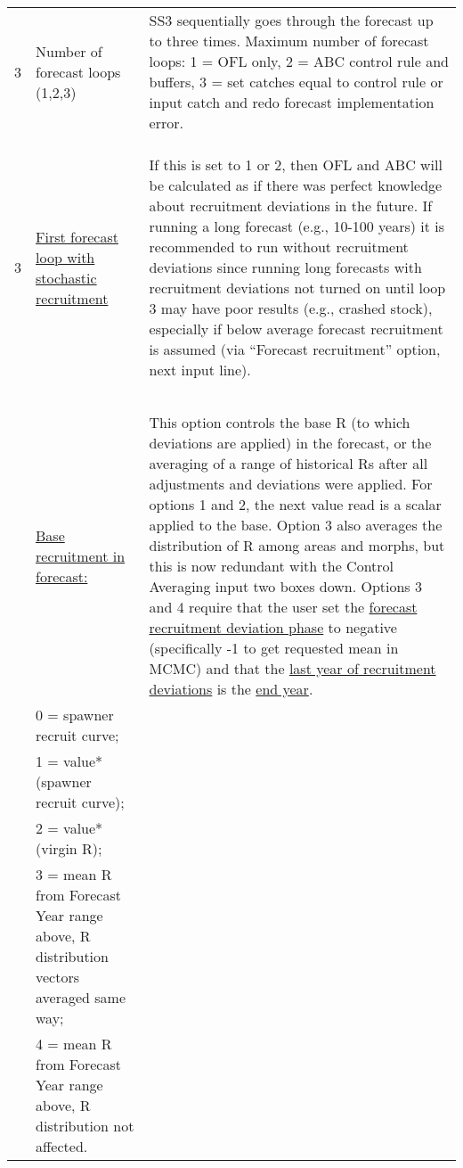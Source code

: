 \begin{landscape}
{\begin{longtable}{p{3.2cm} p{7cm} p{10.8cm}}
  \hline
  3 \Tstrut & Number of forecast loops (1,2,3) & \multirow{1}{1cm}[-0.25cm]{\parbox{11cm}{SS3 sequentially goes through the forecast up to three times. Maximum number of forecast loops: 1 = OFL only, 2 = ABC control rule and buffers, 3 = set catches equal to control rule or input catch and redo forecast implementation error.}} \\
    & & \\
    & & \\
    & & \Bstrut\Bstrut\\

  \hline
  3 \Tstrut & \hyperlink{appendB}{First forecast loop with stochastic recruitment} & \multirow{1}{1cm}[-0.25cm]{\parbox{11cm}{If this is set to 1 or 2, then OFL and ABC will be calculated as if there was perfect knowledge about recruitment deviations in the future. If running a long forecast (e.g., 10-100 years) it is recommended to run without recruitment deviations since running long forecasts with recruitment deviations not turned on until loop 3 may have poor results (e.g., crashed stock), especially if below average forecast recruitment is assumed (via ``Forecast recruitment'' option, next input line).}} \Bstrut\\
    & & \\
    & & \\
    & & \\
    & & \\
    & & \\

  \pagebreak
  1 \Tstrut & \hyperlink{ForeSpawn}{Base recruitment in forecast:} & \multirow{1}{1cm}[-0.25cm]{\parbox{11cm}{This option controls the base R (to which deviations are applied) in the forecast, or the averaging of a range of historical Rs after all adjustments and deviations were applied. For options 1 and 2, the next value read is a scalar applied to the base. Option 3 also averages the distribution of R among areas and morphs, but this is now redundant with the Control Averaging input two boxes down. Options 3 and 4 require that the user set the \hyperlink{FcastRecDevPhase}{forecast recruitment deviation phase} to negative (specifically -1 to get requested mean in MCMC) and that the \hyperlink{RecDevEndYear}{last year of recruitment deviations} is the \hyperlink{EndYear}{end year}.}} \\
    & 0 = spawner recruit curve; & \\
    & 1 = value*(spawner recruit curve); & \\
    & 2 = value*(virgin R); & \\
    & 3 = mean R from Forecast Year range above, R distribution vectors averaged same way; & \\
    & 4 = mean R from Forecast Year range above, R distribution not affected. & \Bstrut\\


\end{longtable}}
\end{landscape}
